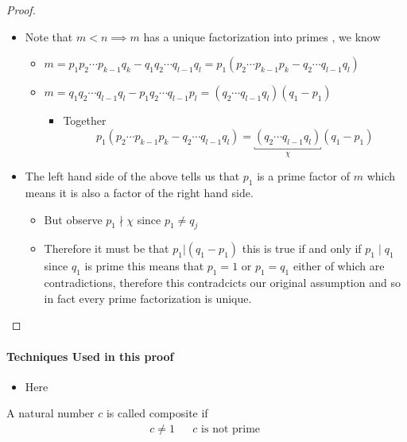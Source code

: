 \documentclass[11pt]{book}
\begin{document}
\begin{proof}
\begin{itemize}
\begin{itemize}
        \end{itemize}
    \item Note that $m < n \implies m$ has a unique factorization into primes , we know
        \begin{itemize}
            \item $m = p_1 p_2 \dotsb p_{k - 1} q_{k}  - q_1 q_2 \dotsb q_{l - 1} q_{l}= p_{1} \left( p_2 \dotsb p_{k - 1} p_{k} - q_2 \dotsb q_{l - 1} q_{l} \right) $ 
            \item $m = q_1 q_2 \dotsb q_{l - 1} q_{l} - p_1 q_2 \dotsb q_{l - 1} p_{l} = \left(  q_2 \dotsb q_{l - 1} q_{l} \right) \left( q_{1}  - p_{1}  \right) $ 
            \begin{itemize}
                \item Together
                    \[
 p_{1} \left( p_2 \dotsb p_{k - 1} p_{k} - q_2 \dotsb q_{l - 1} q_{l} \right) = \underbracket{\left(  q_2 \dotsb q_{l - 1} q_{l} \right)}_{\chi}  \left( q_{1}  - p_{1}  \right) 
                    \]
            \end{itemize}
        \end{itemize}
    \item The left hand side of the above tells us that $p_{1} $ is a prime factor of $m$ which means it is also a factor of the right hand side.
        \begin{itemize}
            \item But observe $p_{1} \nmid \chi$ since $p_{1} \neq q_{j} $ 
            \item Therefore it must be that $p_{1} | \left( q_{1}  - p_{1}  \right) $ this is true if and only if $p_{1} \mid q_{1} $ since $q_{1} $ is prime this means that $p_{1} = 1$ or $p_{1} = q_{1} $ either of which are contradictions, therefore this contradcicts our original assumption and so in fact every prime factorization is unique.
        \end{itemize}
\end{itemize}
\end{proof}

\paragraph{Techniques Used in this proof} 
\begin{itemize}
    \item Here
\end{itemize}

\begin{defn}[Composite]\label{defn:composite}
    A natural number $c$ is called composite if
    \begin{align*}
        c \neq 1 && c \text{ is not prime } 
    \end{align*}
\end{defn}
\end{document}
